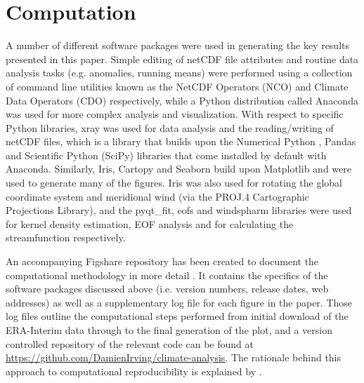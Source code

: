\section{Computation}

A number of different software packages were used in generating the key results presented in this paper. Simple editing of netCDF file attributes and routine data analysis tasks (e.g. anomalies, running means) were performed using a collection of command line utilities known as the NetCDF Operators (NCO) and Climate Data Operators (CDO) respectively, while a Python distribution called Anaconda was used for more complex analysis and visualization. With respect to specific Python libraries, xray was used for data analysis and the reading/writing of netCDF files, which is a library that builds upon the Numerical Python \citep[NumPy;][]{VanDerWalt2011}, Pandas and Scientific Python (SciPy) libraries that come installed by default with Anaconda. Similarly, Iris, Cartopy and Seaborn build upon Matplotlib \citep[the default Python plotting library;][]{Hunter2007} and were used to generate many of the figures. Iris was also used for rotating the global coordinate system and meridional wind (via the PROJ.4 Cartographic Projections Library), and the pyqt\_fit, eofs and windspharm libraries were used for kernel density estimation, EOF analysis and for calculating the streamfunction respectively.

An accompanying Figshare repository has been created to document the computational methodology in more detail \citep{Irving2016a}. It contains the specifics of the software packages discussed above (i.e. version numbers, release dates, web addresses) as well as a supplementary log file for each figure in the paper. Those log files outline the computational steps performed from initial download of the ERA-Interim data through to the final generation of the plot, and a version controlled repository of the relevant code can be found at \url{https://github.com/DamienIrving/climate-analysis}. The rationale behind this approach to computational reproducibility is explained by \citet{Irving2016}.
